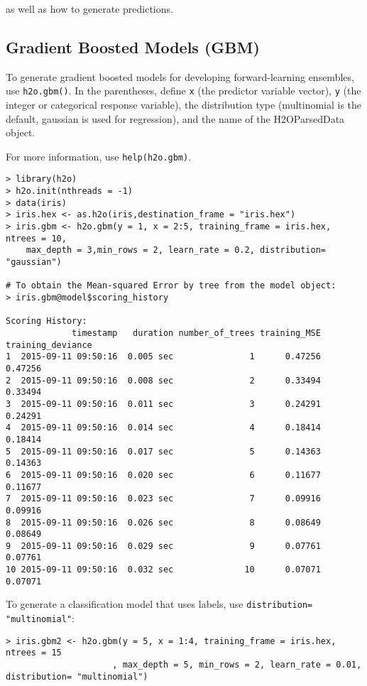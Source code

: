 {{\begin{itemize}
\end{itemize}
as well as how to generate predictions. 


\subsection{Gradient Boosted Models (GBM)}
To generate gradient boosted models for developing forward-learning ensembles, use {\texttt{h2o.gbm()}}.  In the parentheses, define \texttt{x} (the predictor variable vector), \texttt{y} (the integer or categorical response variable), the distribution type (multinomial is the default, gaussian is used for regression), and the name of the H2OParsedData object. 

For more information, use {\texttt{help(h2o.gbm)}}.
\smallskip
\begin{lstlisting}[style=R]
> library(h2o)
> h2o.init(nthreads = -1)
> data(iris)
> iris.hex <- as.h2o(iris,destination_frame = "iris.hex")
> iris.gbm <- h2o.gbm(y = 1, x = 2:5, training_frame = iris.hex, ntrees = 10,
    max_depth = 3,min_rows = 2, learn_rate = 0.2, distribution= "gaussian")

# To obtain the Mean-squared Error by tree from the model object:
> iris.gbm@model$scoring_history

Scoring History:
             timestamp   duration number_of_trees training_MSE training_deviance
1  2015-09-11 09:50:16  0.005 sec               1      0.47256           0.47256
2  2015-09-11 09:50:16  0.008 sec               2      0.33494           0.33494
3  2015-09-11 09:50:16  0.011 sec               3      0.24291           0.24291
4  2015-09-11 09:50:16  0.014 sec               4      0.18414           0.18414
5  2015-09-11 09:50:16  0.017 sec               5      0.14363           0.14363
6  2015-09-11 09:50:16  0.020 sec               6      0.11677           0.11677
7  2015-09-11 09:50:16  0.023 sec               7      0.09916           0.09916
8  2015-09-11 09:50:16  0.026 sec               8      0.08649           0.08649
9  2015-09-11 09:50:16  0.029 sec               9      0.07761           0.07761
10 2015-09-11 09:50:16  0.032 sec              10      0.07071           0.07071
\end{lstlisting}

To generate a classification model that uses labels, use {\texttt{distribution= "multinomial"}}: 
\smallskip
\begin{lstlisting}[style=R]
> iris.gbm2 <- h2o.gbm(y = 5, x = 1:4, training_frame = iris.hex, ntrees = 15
                     , max_depth = 5, min_rows = 2, learn_rate = 0.01, distribution= "multinomial")
   

\end{lstlisting}}}
